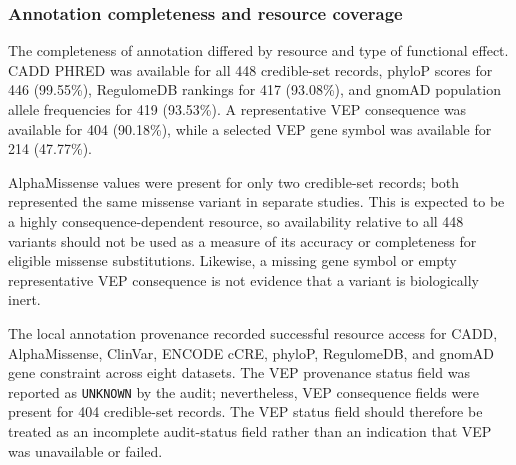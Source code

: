 \documentclass[11pt,a4paper]{article}
\begin{document}
\subsubsection{Annotation completeness and resource coverage}

The completeness of annotation differed by resource and
type of functional effect. CADD PHRED was available
for all 448 credible-set records, phyloP scores for
446 (99.55\%), RegulomeDB rankings for 417 (93.08\%),
and gnomAD population allele frequencies for 419
(93.53\%). A representative VEP consequence was
available for 404 (90.18\%), while a selected VEP gene
symbol was available for 214 (47.77\%).

AlphaMissense values were present for only two
credible-set records; both represented the same
missense variant in separate studies. This is expected
to be a highly consequence-dependent resource, so
availability relative to all 448 variants should not be
used as a measure of its accuracy or completeness for
eligible missense substitutions. Likewise, a missing
gene symbol or empty representative VEP consequence
is not evidence that a variant is biologically inert.

The local annotation provenance recorded successful
resource access for CADD, AlphaMissense, ClinVar,
ENCODE cCRE, phyloP, RegulomeDB, and gnomAD gene
constraint across eight datasets. The VEP provenance
status field was reported as \texttt{UNKNOWN} by the
audit; nevertheless, VEP consequence fields were
present for 404 credible-set records. The VEP status
field should therefore be treated as an incomplete
audit-status field rather than an indication that VEP
was unavailable or failed.
\end{document}
